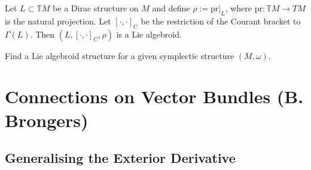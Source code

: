 \begin{example}
  Let $L\subset\mathbb{T}M$ be a Dirac structure on $M$ and define $\rho:=\text{pr}|_L$, where $\text{pr}:\mathbb{T}M\to TM$ is the natural projection. Let $[\cdot,\cdot]_C$ be the restriction of the Courant bracket to $\Gamma(L)$. Then $(L,[\cdot,\cdot]_C,\rho)$ is a Lie algebroid.
\end{example}
\begin{exercise}
  Find a Lie algebroid structure for a given symplectic structure $(M,\omega)$.
\end{exercise}

\chapter{Connections on Vector Bundles (B. Brongers)}

\section{Generalising the Exterior Derivative}

